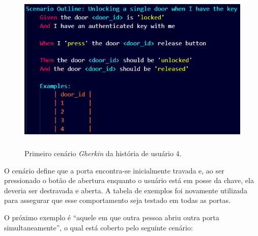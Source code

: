 


\begin{figure}[H]
\centering
\includegraphics[height=8cm]{figuras/cenarios/h4c1.png}
\caption{Primeiro cenário \textit{Gherkin} da história de usuário 4.}
\label{fig:h4c1}
\end{figure}

O cenário define que a porta encontra-se inicialmente travada e, ao ser pressionado o botão de abertura enquanto o usuário está em posse da chave, ela deveria 
ser destravada e aberta. A tabela de exemplos foi novamente utilizada para assegurar que esse comportamento seja testado em todas as portas.

O próximo exemplo é ``aquele em que outra pessoa abriu outra porta simultaneamente'', o qual está coberto pelo seguinte cenário:





